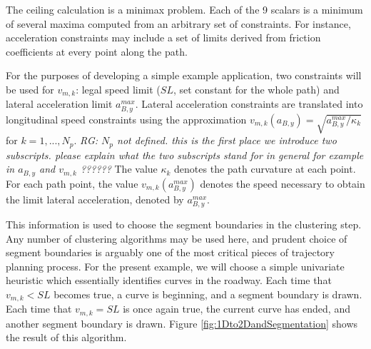 \documentclass[letterpaper, 10 pt, conference]{ieeeconf}  %
\begin{document}
The ceiling calculation is a minimax problem.
Each of the 9 scalars is a minimum of several maxima computed from an arbitrary set of constraints.
For instance, acceleration constraints may include a set of limits derived from friction coefficients at every point along the path.


For the purposes of developing a simple example application, two constraints will be used for $v_{m,k}$: legal speed limit ($SL$, set constant for the whole path) and lateral acceleration limit $a_{B,y}^{max}$. 
Lateral acceleration constraints are translated into longitudinal speed constraints using the approximation $v_{m,k}(a_{B,y}) = \sqrt{a_{B,y}^{max}/\kappa_k}$ for $k = 1, ..., N_p$.
\emph{RG: $N_p$ not defined. this is the first place we introduce two subscripts. please explain what the two subscripts stand for in general for example in $a_{B,y}$ and $v_{m,k}$ ?????? }
The value $\kappa_k$ denotes the path curvature at each point.
For each path point, the value $v_{m,k}(a_{B,y}^{max})$ denotes the speed necessary to obtain the limit lateral acceleration, denoted by $a^{max}_{B,y}$.

This information is used to choose the segment boundaries in the clustering step.
Any number of clustering algorithms may be used here, and prudent choice of segment boundaries is arguably one of the most critical pieces of trajectory planning process.
For the present example, we will choose a simple univariate heuristic which essentially identifies curves in the roadway.
Each time that $v_{m,k} < SL$ becomes true, a curve is beginning, and a segment boundary is drawn.
Each time that $v_{m,k} = SL$ is once again true, the current curve has ended, and another segment boundary is drawn.
Figure \ref{fig:1Dto2DandSegmentation} shows the result of this algorithm. 


\end{document}
